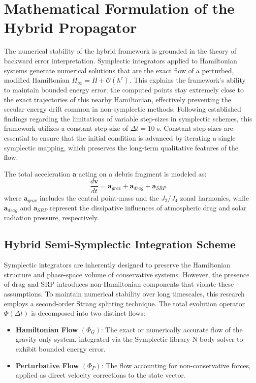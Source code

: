 \documentclass[letterpaper,11pt]{AAS}
\begin{document}
\section{Mathematical Formulation of the Hybrid Propagator}
\label{sec:mathematical_formulation}

The numerical stability of the hybrid framework is grounded in the theory of backward error interpretation. Symplectic integrators applied to Hamiltonian systems generate numerical solutions that are the exact flow of a perturbed, modified Hamiltonian $H_{\infty} = H + \mathcal{O}(h^r)$. This explains the framework's ability to maintain bounded energy error; the computed points stay extremely close to the exact trajectories of this nearby Hamiltonian, effectively preventing the secular energy drift common in non-symplectic methods. Following established findings regarding the limitations of variable step-sizes in symplectic schemes, this framework utilizes a constant step-size of $\Delta t = 10$ s. Constant step-sizes are essential to ensure that the initial condition is advanced by iterating a single symplectic mapping, which preserves the long-term qualitative features of the flow.

The total acceleration $\mathbf{a}$ acting on a debris fragment is modeled as:
\begin{equation}
    \frac{d\mathbf{v}}{dt} = \mathbf{a}_{grav} + \mathbf{a}_{drag} + \mathbf{a}_{SRP}
    \label{eq:total_accel}
\end{equation}
where $\mathbf{a}_{grav}$ includes the central point-mass and the $J_2/J_4$ zonal harmonics, while $\mathbf{a}_{drag}$ and $\mathbf{a}_{SRP}$ represent the dissipative influences of atmospheric drag and solar radiation pressure, respectively.

\subsection{Hybrid Semi-Symplectic Integration Scheme}
Symplectic integrators are inherently designed to preserve the Hamiltonian structure and phase-space volume of conservative systems. However, the presence of drag and SRP introduces non-Hamiltonian components that violate these assumptions. To maintain numerical stability over long timescales, this research employs a second-order Strang splitting technique. The total evolution operator $\Phi(\Delta t)$ is decomposed into two distinct flows:
\begin{itemize}
    \item \textbf{Hamiltonian Flow} $(\Phi_G)$: The exact or numerically accurate flow of the gravity-only system, integrated via the Symplectic library N-body solver to exhibit bounded energy error.
    \item \textbf{Perturbative Flow} $(\Phi_P)$: The flow accounting for non-conservative forces, applied as direct velocity corrections to the state vector.
\end{itemize}
\end{document}
